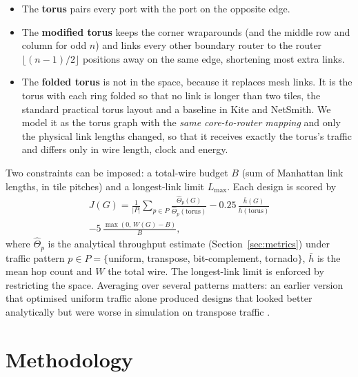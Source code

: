 \documentclass[preprint,12pt,a4paper]{elsarticle}
\begin{document}
\begin{itemize}
\item The \textbf{torus} pairs every port with the port on the opposite edge.
\item The \textbf{modified torus} \cite{thesis2023} keeps the corner
  wraparounds (and the middle row and column for odd $n$) and links every
  other boundary router to the router $\lfloor (n-1)/2\rfloor$ positions
  away on the same edge, shortening most extra links.
\item The \textbf{folded torus} \cite{dally2004principles} is not in the
  space, because it replaces mesh links. It is the torus with each ring
  folded so that no link is longer than two tiles, the standard practical
  torus layout and a baseline in Kite and NetSmith. We model it as the
  torus graph with the \emph{same core-to-router mapping} and only the
  physical link lengths changed, so that it receives exactly the torus's
  traffic and differs only in wire length, clock and energy.
\end{itemize}

Two constraints can be imposed: a total-wire budget $B$ (sum of Manhattan
link lengths, in tile pitches) and a longest-link limit $L_{\max}$. Each
design is scored by
\begin{multline}
  J(G) = \frac{1}{|P|}\sum_{p\in P}\frac{\hat\Theta_p(G)}{\hat\Theta_p(\text{torus})}
  - 0.25\,\frac{\bar h(G)}{\bar h(\text{torus})} \\
  - 5\,\frac{\max(0,\,W(G)-B)}{B},
  \label{eq:objective}
\end{multline}
where $\hat\Theta_p$ is the analytical throughput estimate (Section~\ref{sec:metrics})
under traffic pattern $p\in P=\{$uniform, transpose, bit-complement,
tornado$\}$, $\bar h$ is the mean hop count and $W$ the total wire. The
longest-link limit is enforced by restricting the space. Averaging over
several patterns matters: an earlier version that optimised uniform traffic
alone produced designs that looked better analytically but were worse in
simulation on transpose traffic \cite{ray2026preprint}.

\section{Methodology}
\label{sec:method}
\end{document}
